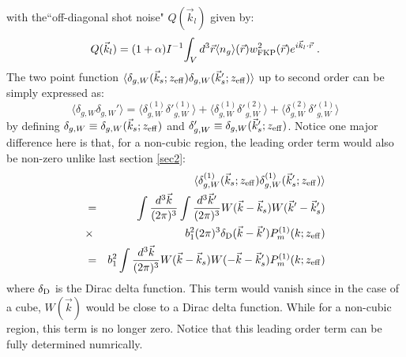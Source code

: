 \documentclass[prd,amsmath,amssymb,floatfix,superscriptaddress,nofootinbib,twocolumn]{revtex4-1}
\def\be{\begin{equation}}
\def\ee{\end{equation}}
\def\bea{\begin{eqnarray}}
\def\eea{\end{eqnarray}}
\newcommand{\vrr}{\vec{r}}
\newcommand{\vs}{\nonumber\\}
\newcommand{\vk}{\vec{k}}
\begin{document}
with the``off-diagonal shot noise" $Q(\vk_l)$ given by:
\be 
Q(\vk_l)=(1+\alpha)I^{-1}{\int_{V}d^{3}\vec{r} \langle n_{g}\rangle (\vec{r}) w_{\rm FKP}^{2}(\vec{r})e^{i\vec{k}_l\cdot \vrr}}\;.
\ee 
The two point function $\langle \delta_{g,W}(\vec{k}_s;z_{\rm eff})\delta_{g,W}(\vec{k}'_s;z_{\rm eff}) \rangle$ up to second order can be simply expressed as:
\be 
\langle \delta_{g,W}\delta_{g,W}' \rangle=\langle \delta^{(1)}_{g,W}\delta'^{(1)}_{g,W} \rangle+\langle \delta^{(1)}_{g,W}\delta'^{(2)}_{g,W} \rangle+\langle \delta^{(2)}_{g,W}\delta'^{(1)}_{g,W} \rangle
\ee
by defining $\delta_{g,W}\equiv\delta_{g,W}(\vec{k}_s;z_{\rm eff})$ and $\delta_{g,W}'\equiv\delta_{g,W}(\vec{k}'_s;z_{\rm eff})$. Notice one major difference here is that, for a non-cubic region, the leading order term would also be non-zero unlike last section \ref{sec2}:
\bea
&&\langle\delta^{(1)}_{g,W}(\vec{k}_s;z_{\rm eff})\delta^{(1)}_{g,W}(\vec{k}'_s;z_{\rm eff})\rangle \vs
&=&\int \frac{d^3\vec{k}}{(2\pi)^3}\int \frac{d^3\vec{k}'}{(2\pi)^3}W(\vk-\vk_s)W(\vk'-\vk'_s)\vs
&\times & b_1^2 (2\pi)^3\delta_{\rm D} (\vk-\vk') P_m^{(1)}(k;z_{\rm eff})\vs
&=&b_1^2\int \frac{d^3\vec{k}}{(2\pi)^3}W(\vk-\vk_s)W(-\vk-\vk'_s)P_m^{(1)}(k;z_{\rm eff})
\eea 
where $\delta_{\rm D}$ is the Dirac delta function. This term would vanish since in the case of a cube, $W(\vk)$ would be close to a Dirac delta function. While for a non-cubic region, this term is no longer zero. Notice that this leading order term can be fully determined numrically.
\end{document}
